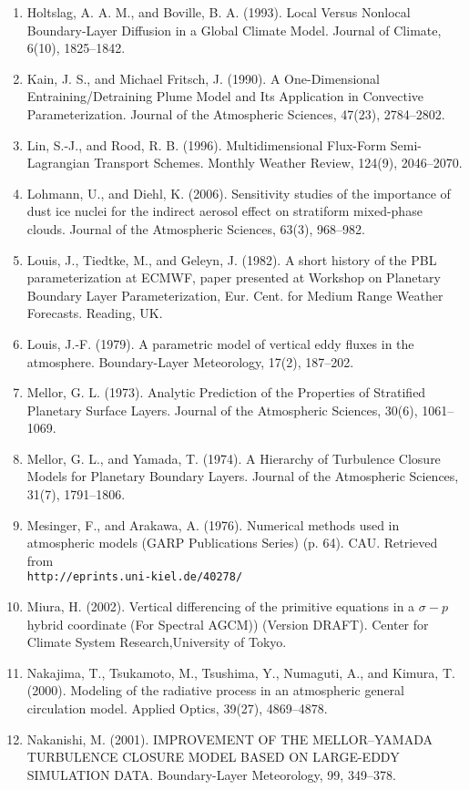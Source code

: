 \begin{enumerate}
\item Holtslag, A. A. M., and Boville, B. A. (1993). Local Versus Nonlocal Boundary-Layer Diffusion in a Global Climate Model. Journal of Climate, 6(10), 1825–1842.
\item Kain, J. S., and Michael Fritsch, J. (1990). A One-Dimensional Entraining/Detraining Plume Model and Its Application in Convective Parameterization. Journal of the Atmospheric Sciences, 47(23), 2784–2802.
\item Lin, S.-J., and Rood, R. B. (1996). Multidimensional Flux-Form Semi-Lagrangian Transport Schemes. Monthly Weather Review, 124(9), 2046–2070.
\item Lohmann, U., and Diehl, K. (2006). Sensitivity studies of the importance of dust ice nuclei for the indirect aerosol effect on stratiform mixed-phase clouds. Journal of the Atmospheric Sciences, 63(3), 968–982.
\item Louis, J., Tiedtke, M., and Geleyn, J. (1982). A short history of the PBL parameterization at ECMWF, paper presented at Workshop on Planetary Boundary Layer Parameterization, Eur. Cent. for Medium Range Weather Forecasts. Reading, UK.
\item Louis, J.-F. (1979). A parametric model of vertical eddy fluxes in the atmosphere. Boundary-Layer Meteorology, 17(2), 187–202.
\item Mellor, G. L. (1973). Analytic Prediction of the Properties of Stratified Planetary Surface Layers. Journal of the Atmospheric Sciences, 30(6), 1061–1069.
\item Mellor, G. L., and Yamada, T. (1974). A Hierarchy of Turbulence Closure Models for Planetary Boundary Layers. Journal of the Atmospheric Sciences, 31(7), 1791–1806.
\item Mesinger, F., and Arakawa, A. (1976). Numerical methods used in atmospheric models (GARP Publications Series) (p. 64). CAU. Retrieved from \\
\texttt{http://eprints.uni-kiel.de/40278/}
\item Miura, H. (2002). Vertical differencing of the primitive equations in a $\sigma - p$ hybrid coordinate (For Spectral AGCM)) (Version DRAFT). Center for Climate System Research,University of Tokyo.
\item Nakajima, T., Tsukamoto, M., Tsushima, Y., Numaguti, A., and Kimura, T. (2000). Modeling of the radiative process in an atmospheric general circulation model. Applied Optics, 39(27), 4869–4878.
\item Nakanishi, M. (2001). IMPROVEMENT OF THE MELLOR–YAMADA TURBULENCE CLOSURE MODEL BASED ON LARGE-EDDY SIMULATION DATA. Boundary-Layer Meteorology, 99, 349–378.

\end{enumerate}

